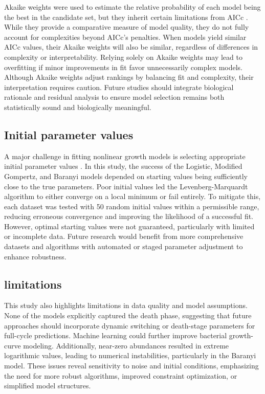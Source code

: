 \documentclass{article}
\begin{document}
Akaike weights were used to estimate the relative probability of each model being the best in the candidate set, but they inherit certain limitations from AICc \citep{Stephan2011}. While they provide a comparative measure of model quality, they do not fully account for complexities beyond AICc’s penalties. When models yield similar AICc values, their Akaike weights will also be similar, regardless of differences in complexity or interpretability. Relying solely on Akaike weights may lead to overfitting if minor improvements in fit favor unnecessarily complex models. Although Akaike weights adjust rankings by balancing fit and complexity, their interpretation requires caution. Future studies should integrate biological rationale and residual analysis to ensure model selection remains both statistically sound and biologically meaningful.



\subsection{Initial parameter values}

A major challenge in fitting nonlinear growth models is selecting appropriate initial parameter values \citep{Paine2012}. In this study, the success of the Logistic, Modified Gompertz, and Baranyi models depended on starting values being sufficiently close to the true parameters. Poor initial values led the Levenberg-Marquardt algorithm to either converge on a local minimum or fail entirely. To mitigate this, each dataset was tested with 50 random initial values within a permissible range, reducing erroneous convergence and improving the likelihood of a successful fit. However, optimal starting values were not guaranteed, particularly with limited or incomplete data. Future research would benefit from more comprehensive datasets and algorithms with automated or staged parameter adjustment to enhance robustness.




\subsection{limitations}

This study also highlights limitations in data quality and model assumptions. None of the models explicitly captured the death phase, suggesting that future approaches should incorporate dynamic switching or death-stage parameters for full-cycle predictions. Machine learning could further improve bacterial growth-curve modeling. Additionally, near-zero abundances resulted in extreme logarithmic values, leading to numerical instabilities, particularly in the Baranyi model. These issues reveal sensitivity to noise and initial conditions, emphasizing the need for more robust algorithms, improved constraint optimization, or simplified model structures.
\end{document}
